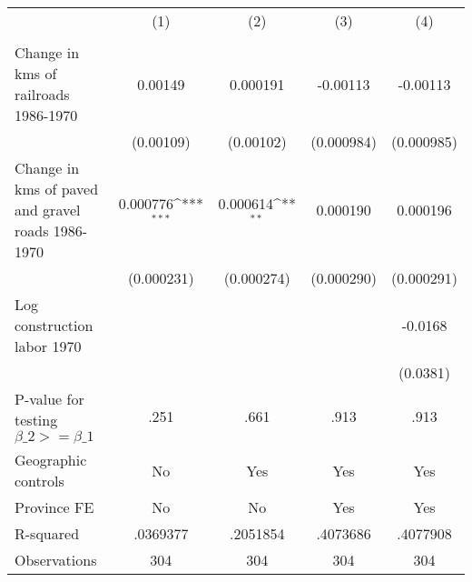 {
\def\sym#1{\ifmmode^{#1}\else\(^{#1}\)\fi}
\begin{tabular}{l*{4}{c}}
\hline\hline
                &\multicolumn{1}{c}{(1)}&\multicolumn{1}{c}{(2)}&\multicolumn{1}{c}{(3)}&\multicolumn{1}{c}{(4)}\\
                &\multicolumn{1}{c}{}&\multicolumn{1}{c}{}&\multicolumn{1}{c}{}&\multicolumn{1}{c}{}\\
\hline
Change in kms of railroads 1986-1970&  0.00149         & 0.000191         & -0.00113         & -0.00113         \\
                &(0.00109)         &(0.00102)         &(0.000984)         &(0.000985)         \\
[1em]
Change in kms of paved and gravel roads 1986-1970& 0.000776\sym{***}& 0.000614\sym{**} & 0.000190         & 0.000196         \\
                &(0.000231)         &(0.000274)         &(0.000290)         &(0.000291)         \\
[1em]
Log construction labor 1970&                  &                  &                  &  -0.0168         \\
                &                  &                  &                  & (0.0381)         \\
\hline
P-value for testing $\beta\_{2} >= \beta\_{1}$&     .251         &     .661         &     .913         &     .913         \\
Geographic controls&       No         &      Yes         &      Yes         &      Yes         \\
Province FE     &       No         &       No         &      Yes         &      Yes         \\
R-squared       & .0369377         & .2051854         & .4073686         & .4077908         \\
Observations    &      304         &      304         &      304         &      304         \\
\hline\hline
\end{tabular}
}
